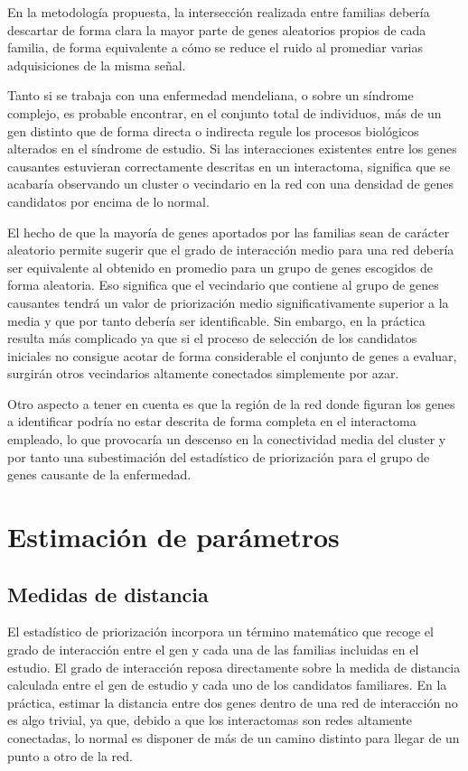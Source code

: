 \medskip
En la metodología propuesta, la intersección realizada entre familias debería descartar de forma clara la mayor parte de genes aleatorios propios de cada familia, de forma equivalente a cómo se reduce el ruido al promediar varias adquisiciones de la misma señal. 

\medskip
Tanto si se trabaja con una enfermedad mendeliana, o sobre un síndrome complejo, es probable encontrar, en el conjunto total de individuos, más de un gen distinto que de forma directa o indirecta regule los procesos biológicos alterados en el síndrome de estudio. Si las interacciones existentes entre los genes causantes estuvieran correctamente descritas en un interactoma, significa que se acabaría observando un cluster o vecindario en la red con una densidad de genes candidatos por encima de lo normal. 

\medskip
El hecho de que la mayoría de genes aportados por las familias sean de carácter aleatorio permite sugerir que el grado de interacción medio para una red debería ser equivalente al obtenido en promedio para un grupo de genes escogidos de forma aleatoria. Eso significa que el vecindario que contiene al grupo de genes causantes tendrá un valor de priorización medio significativamente superior a la media y que por tanto debería ser identificable. Sin embargo, en la práctica resulta más complicado ya que si el proceso de selección de los candidatos iniciales no consigue acotar de forma considerable el conjunto de genes a evaluar, surgirán otros vecindarios altamente conectados simplemente por azar. 

\medskip
Otro aspecto a tener en cuenta es que la región de la red donde figuran los genes a identificar podría no estar descrita de forma completa en el interactoma empleado, lo que provocaría un descenso en la conectividad media del cluster y por tanto una subestimación del estadístico de priorización para el grupo de genes causante de la enfermedad.


\section{Estimación de parámetros}
	
	\subsection{Medidas de distancia}
	
	El estadístico de priorización incorpora un término matemático que recoge el grado de interacción entre el gen y cada una de las familias incluidas en el estudio. El grado de interacción reposa directamente sobre la medida de distancia calculada entre el gen de estudio y cada uno de los candidatos familiares. En la práctica, estimar la distancia entre dos genes dentro de una red de interacción no es algo trivial, ya que, debido a que los interactomas son redes altamente conectadas, lo normal es disponer de más de un camino distinto para llegar de un punto a otro de la red. 
	
